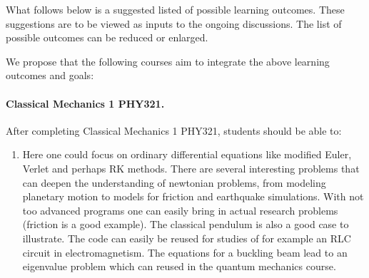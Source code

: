 \documentclass[%
oneside,                 %
final,                   %
10pt]{article}
\begin{document}
What follows below is a suggested listed of possible learning outcomes. These suggestions are to be viewed as inputs to the ongoing discussions. The list of possible outcomes can be reduced or enlarged. 

% 
% 

We propose that the following courses aim to integrate the above learning outcomes and goals:


\paragraph{Classical Mechanics 1 PHY321.}
After completing Classical Mechanics 1 PHY321, students should be able to:

\begin{enumerate}
  \item Here one could focus on ordinary differential equations like modified Euler, Verlet and perhaps RK methods. There are several interesting problems that can deepen the understanding of newtonian problems, from modeling planetary motion to models for friction and earthquake simulations. With not too advanced programs one can easily bring in actual research problems (friction is a good example).  The classical pendulum is also a good case to illustrate. The code can easily be reused for studies of for example an RLC circuit in electromagnetism. The equations for a buckling beam lead to an eigenvalue problem which can reused in the quantum mechanics course.
\end{enumerate}

\noindent
\end{document}
